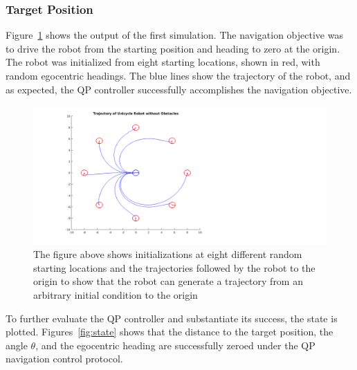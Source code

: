 \documentclass[journal]{IEEEtran}
\begin{document}
\subsubsection{Target Position}
Figure~\ref{fig:octoplotsans} shows the output of the first simulation. The navigation objective was to drive the robot from the starting position and heading to zero at the origin. The robot was initialized from eight starting locations, shown in red, with random egocentric headings. The blue lines show the trajectory of the robot, and as expected, the QP controller successfully accomplishes the navigation objective.

\begin{figure}[h!]
\centering
\includegraphics[scale=0.4]{octoPlotCrisisSQR.png} 
\caption{The figure above shows initializations at eight different random starting locations and the trajectories followed by the robot to the origin to show that the robot can generate a trajectory from an arbitrary initial condition to the origin \label{fig:octoplotsans}} 
\end{figure}

To further evaluate the QP controller and substantiate its success, the state is plotted. Figures~\ref{fig:state} shows that the distance to the target position, the angle $\theta$, and the egocentric heading are successfully zeroed under the QP navigation control protocol.
\end{document}
